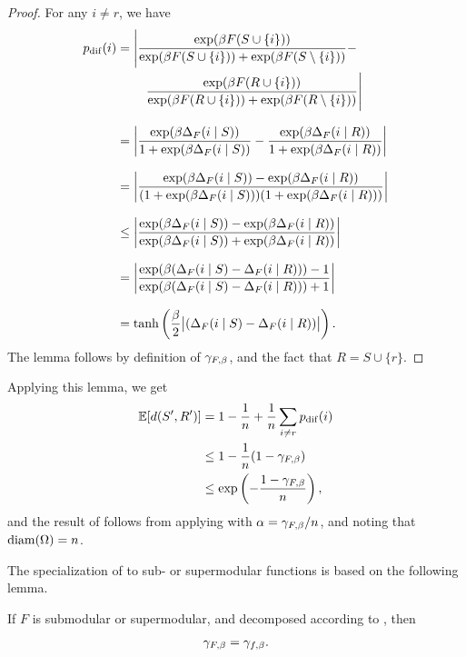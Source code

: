 \begin{proof}
  For any $i \neq r$, we have
  \begin{align*}
    p_{\mathrm{dif}}(i) &= \Bigg|\frac{\exp(\beta F(S \cup \{i\}))}{\exp(\beta F(S \cup \{i\})) + \exp(\beta F(S \setminus \{i\}))} -\\
    &\ \ \ \ \ \ \ \frac{\exp(\beta F(R \cup \{i\}))}{\exp(\beta F(R \cup \{i\})) + \exp(\beta F(R \setminus \{i\}))}\Bigg|\\[0.8em]
    &= \left|\frac{\exp(\beta \D_F(i\mid S))}{1 + \exp(\beta \D_F(i\mid S))} - \frac{\exp(\beta \D_F(i\mid R))}{1 + \exp(\beta \D_F(i\mid R))}\right|\\[0.8em]
    &= \left|\frac{\exp(\beta \D_F(i\mid S)) - \exp(\beta \D_F(i\mid R))}{(1 + \exp(\beta \D_F(i\mid S)))(1 + \exp(\beta \D_F(i\mid R)))}\right|\\[0.8em]
    &\leq \left|\frac{\exp(\beta \D_F(i\mid S)) - \exp(\beta \D_F(i\mid R))}{\exp(\beta \D_F(i\mid S)) + \exp(\beta \D_F(i\mid R))}\right|\\[0.8em]
    &= \left|\frac{\exp(\beta (\D_F(i\mid S) - \D_F(i\mid R))) - 1}{\exp(\beta (\D_F(i\mid S) - \D_F(i\mid R))) + 1}\right|\\[0.8em]
    &= \tanh \left(\frac{\beta}{2}\big|(\D_F(i\mid S) - \D_F(i\mid R)) \big|\right).
  \end{align*}
  The lemma follows by definition of $\gf$, and the fact that $R = S \cup \{r\}$.
\end{proof}
\noindent Applying this lemma, we get
\begin{align*}
  \E[d(S', R')] &= 1 -\frac{1}{n} + \frac{1}{n}\sum_{i \neq r}p_{\mathrm{dif}}(i)\\
                &\leq 1 - \frac{1}{n}(1 - \gf)\\
                &\leq \exp\left(-\frac{1-\gf}{n}\right),
\end{align*}
and the result of  follows from applying  with $\alpha = \gf/n$, and noting that $\mathrm{diam}(\ss) = n$.

The specialization of  to sub- or supermodular functions is based on the following lemma.
\begin{lemma}
  If $F$ is submodular or supermodular, and decomposed according to , then
  \begin{align*}
    \gf = \gsf.
  \end{align*}
\end{lemma}

